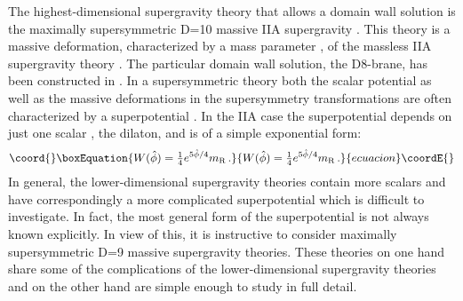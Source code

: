 \documentclass[12pt,a4paper]{article}
\begin{document}
The highest-dimensional supergravity theory that allows a domain
wall solution is the maximally supersymmetric D=10 massive IIA
supergravity \cite{Romans:1986tz}. This theory is a massive
deformation, characterized by a mass parameter \coordHE{}, of the
massless IIA supergravity theory
\cite{Campbell:1984zc,Giani:1984wc}. The particular domain wall
solution, the D8-brane, has been constructed in
\cite{Polchinski:1996df,Bergshoeff:1996ui}. In a supersymmetric
theory both the scalar potential \coordHE{} as well as the massive
deformations in the supersymmetry transformations are often
characterized by a superpotential \coordHE{}. In the IIA case the
superpotential depends on just one scalar \myHighlight{$\hat \phi$}\coordHE{}, the
dilaton, and is of a simple exponential form:
\begin{equation}\coord{}\boxEquation{
W(\hat\phi) = \tfrac{1}{4} e^{5\hat{\phi}/4} m_{\rm R} \, .
\label{sp10}
}{
W(\hat\phi) = \tfrac{1}{4} e^{5\hat{\phi}/4} m_{\rm R} \, .
}{ecuacion}\coordE{}\end{equation}
In general, the lower-dimensional supergravity theories contain
more scalars and have correspondingly a more complicated
superpotential which is difficult to investigate. In fact, the
most general form of the superpotential is not always known
explicitly. In view of this, it is instructive to consider
maximally supersymmetric D=9 massive supergravity theories. These
theories on one hand share some of the complications of the
lower-dimensional supergravity theories and on the other hand are
simple enough to study in full detail.
\end{document}
